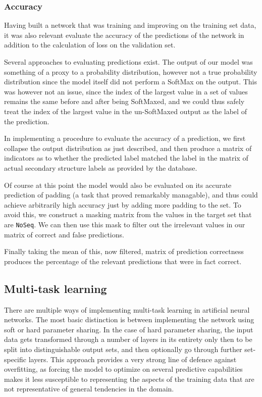 \begin{multicols}{2}
\subsubsection{Accuracy}
Having built a network that was training and improving on the training set data, it was also relevant evaluate the accuracy of the predictions of the network in addition to the calculation of loss on the validation set.

Several approaches to evaluating predictions exist. The output of our model was something of a proxy to a probability distribution, however not a true probability distribution since the model itself did not perform a SoftMax on the output. This was however not an issue, since the index of the largest value in a set of values remains the same before and after being SoftMaxed, and we could thus safely treat the index of the largest value in the un-SoftMaxed output as the label of the prediction.

In implementing a procedure to evaluate the accuracy of a prediction, we first collapse the output distribution as just described, and then produce a matrix of indicators as to whether the predicted label matched the label in the matrix of actual secondary structure labels as provided by the database.

Of course at this point the model would also be evaluated on its accurate prediction of padding (a task that proved remarkably managable), and thus could achieve arbitrarily high accuracy just by adding more padding to the set. To avoid this, we construct a masking matrix from the values in the target set that are \texttt{NoSeq}. We can then use this mask to filter out the irrelevant values in our matrix of correct and false predictions.

Finally taking the mean of this, now filtered, matrix of prediction correctness produces the percentage of the relevant predictions that were in fact correct.

\subsection{Multi-task learning}
There are multiple ways of implementing multi-task learning in artificial neural networks. The most basic distinction is between implementing the network using soft or hard parameter sharing. In the case of hard parameter sharing, the input data gets transformed through a number of layers in its entirety only then to be split into distinguishable output sets, and then optionally go through further set-specific layers. This approach provides a very strong line of defence against overfitting, as forcing the model to optimize on several predictive capabilities makes it less  susceptible to representing the aspects of the training data that are not representative of general tendencies in the domain. 


\end{multicols}
